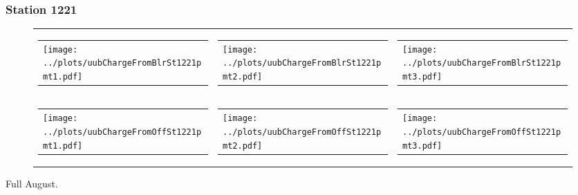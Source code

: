 \documentclass[aspectratio=169]{beamer}
\begin{document}
\begin{frame} 
  \frametitle{Station 1221}
 
  \begin{figure}
    \centering
    \begin{tabularx}{\textwidth}{LCR}
      \begin{tabular}{l}
        \texttt{[image: ../plots/uubChargeFromBlrSt1221pmt1.pdf]}
      \end{tabular}
      &
      \begin{tabular}{l}
        \texttt{[image: ../plots/uubChargeFromBlrSt1221pmt2.pdf]}
      \end{tabular}
      &
      \begin{tabular}{l}
        \texttt{[image: ../plots/uubChargeFromBlrSt1221pmt3.pdf]}
      \end{tabular}
      \\
      \begin{tabular}{l}
        \texttt{[image: ../plots/uubChargeFromOffSt1221pmt1.pdf]}
      \end{tabular}
      &
      \begin{tabular}{l}
        \texttt{[image: ../plots/uubChargeFromOffSt1221pmt2.pdf]}
      \end{tabular}
      &
      \begin{tabular}{l}
        \texttt{[image: ../plots/uubChargeFromOffSt1221pmt3.pdf]}
      \end{tabular}
    \end{tabularx}
  \end{figure}
  Full August. 
\end{frame}
\end{document}
